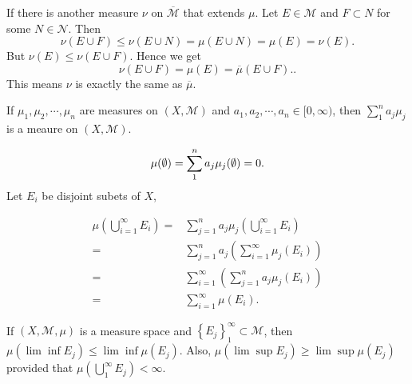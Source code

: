 \begin{sol}
  If there is another measure $\nu$ on $\overline{\mathcal{M}}$ that extends $\mu$. Let $E\in \mathcal{M}$ and $F\subset N$ for some $N\in \mathcal{N}$. Then
  \[
    \nu\left( E\cup F \right)\le \nu\left( E\cup N \right) =\mu\left( E\cup N \right)=\mu\left( E \right)=\nu\left( E \right)  
  .\]
  But $\nu\left( E \right) \le \nu\left( E\cup F \right) $. Hence we get 
   \[
     \nu\left( E\cup F \right) =\mu(E)=\overline{\mu}\left( E\cup F \right). 
  .\]
This means $\nu$ is exactly the same as  $\overline{\mu}$.
\end{sol}
\begin{exe}
  If $\mu_1,\mu_2,\cdots,\mu_n$ are measures on $\left( X,\mathcal{M} \right) $ and $a_1,a_2,\cdots,a_n\in [0,\infty)$, then $\sum_{1}^{n} a_j\mu_j$ is a meaure on $(X,\mathcal{M})$.
\end{exe}
\begin{sol}
  \[
    \mu(\emptyset)=\sum_1^na_j\mu_j(\emptyset)=0
  .\]
  Let $E_i$ be disjoint subets of  $X$,

  \begin{align*}
    \mu\left( \bigcup_{i=1} ^{\infty}E_i \right) =&\sum_{j=1}^{n} a_j\mu_j\left( \bigcup_{i=1} ^{\infty}E_i \right) \\
    =& \sum_{j=1}^{n}a_j\left( \sum_{i=1}^{\infty}\mu_j\left( E_i \right)  \right)\\
    =& \sum_{i=1}^{\infty}\left( \sum_{j=1}^{n}a_j\mu_j\left( E_i \right)  \right) \\
    =&\sum_{i=1}^{\infty}\mu\left( E_{i} \right)  
  .\end{align*}
\end{sol}
\begin{exe}
  If $\left( X,\mathcal{M},\mu \right) $ is a measure space and $\left\{ E_{j} \right\}_1^{\infty} \subset \mathcal{M}$, then $\mu\left( \lim \inf E_j \right)\le \lim \inf \mu(E_j) $. Also, $\mu\left( \lim\sup  E_j \right)\ge \lim\sup\mu\left( E_j \right)  $ provided that $\mu\left( \bigcup_{1} ^{\infty}E_j \right) <\infty$.
\end{exe}

